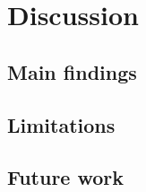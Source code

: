 \section{Discussion}
\label{sec:discussion}

\subsection{Main findings}

\subsection{Limitations}

\subsection{Future work}

